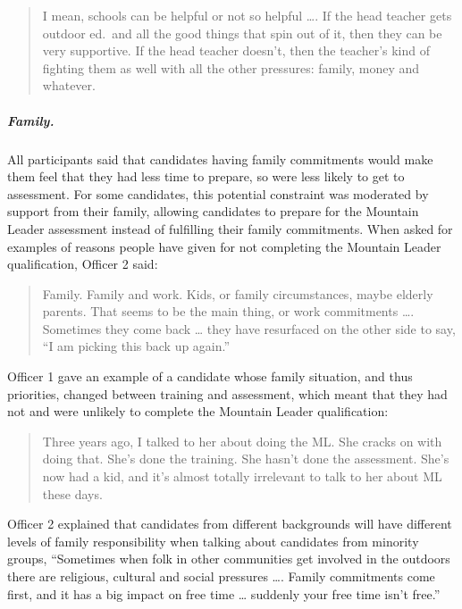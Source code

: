 \documentclass[
  12pt,
  a4paper,
]{book}
\begin{document}
\begin{quote}
I mean, schools can be helpful or not so helpful \ldots. If the head teacher gets outdoor ed.~and all the good things that spin out of it, then they can be very supportive. If the head teacher doesn't, then the teacher's kind of fighting them as well with all the other pressures: family, money and whatever.
\end{quote}

\hypertarget{qual-gta-lack-time-family}{%
\subparagraph{Family.}\label{qual-gta-lack-time-family}}

All participants said that candidates having family commitments would make them feel that they had less time to prepare, so were less likely to get to assessment. For some candidates, this potential constraint was moderated by support from their family, allowing candidates to prepare for the Mountain Leader assessment instead of fulfilling their family commitments. When asked for examples of reasons people have given for not completing the Mountain Leader qualification, Officer 2 said:

\begin{quote}
Family. Family and work. Kids, or family circumstances, maybe elderly parents. That seems to be the main thing, or work commitments \ldots. Sometimes they come back \ldots{} they have resurfaced on the other side to say, ``I am picking this back up again.''
\end{quote}

Officer 1 gave an example of a candidate whose family situation, and thus priorities, changed between training and assessment, which meant that they had not and were unlikely to complete the Mountain Leader qualification:

\begin{quote}
Three years ago, I talked to her about doing the ML. She cracks on with doing that. She's done the training. She hasn't done the assessment. She's now had a kid, and it's almost totally irrelevant to talk to her about ML these days.
\end{quote}

Officer 2 explained that candidates from different backgrounds will have different levels of family responsibility when talking about candidates from minority groups, ``Sometimes when folk in other communities get involved in the outdoors there are religious, cultural and social pressures \ldots. Family commitments come first, and it has a big impact on free time \ldots{} suddenly your free time isn't free.''
\end{document}

